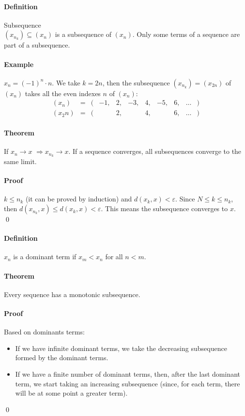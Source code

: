 \documentclass{article}
\newcommand{\Ep}{\varepsilon}
\newcommand{\Def}{\paragraph{Definition}}
\newcommand{\Theorem}{\paragraph{Theorem}}
\newcommand{\Proof}{\paragraph{Proof}}
\newcommand{\Example}{\paragraph{Example}}
\begin{document}
	\Def Subsequence
\\$(x_{n_k}) \subseteq (x_n)$ is a subsequence of $(x_n)$. Only some terms of a
	sequence are part of a subsequence.

	\Example $x_n = (-1)^n \cdot n$. We take $k = 2n$, then the subsequence
	$(x_{n_k}) = (x_{2n})$ of $(x_n)$ takes all the even indexes $n$ of $(x_n)$:
	\begin{equation*}
		\begin{array}{lcrcccccccl}
			(x_n)		& = & ( & -1, & 2, & -3, & 4, & -5, & 6, & \hdots & )\\
			(x_2n)	& = & ( & 		& 2, &		 & 4, &			& 6, & \hdots & )
		\end{array}
	\end{equation*}

	\Theorem If $x_n \to x$ $\Rightarrow x_{n_k} \to x$. If a sequence converges,
	all subsequences converge to the same limit.

	\Proof $k \leq n_k$ (it can be proved by induction) and $d(x_k,x) < \Ep$.
	Since $N \leq k \leq n_k$, then $d(x_{n_k},x) \leq d(x_k,x) < \Ep$. This
	means the subsequence converges to $x$.
\\\qed

	\Def $x_n$ is a dominant term if $x_m < x_n$ for all $n < m$.

	\Theorem Every sequence has a monotonic subsequence.

	\Proof Based on dominants terms:
	\begin{itemize}
		\item If we have infinite dominant terms, we take the decreasing subsequence
		formed by the dominant terms.
		\item If we have a finite number of dominant terms, then, after the last
		dominant term, we start taking an increasing subsequence (since, for each
		term, there will be at some point a greater term).
	\end{itemize}
	\qed
\end{document}
